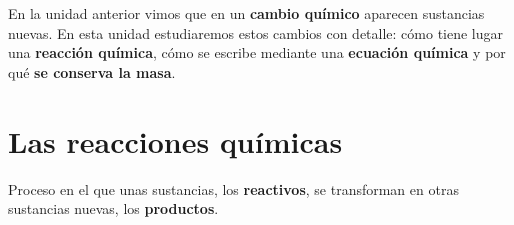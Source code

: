 %
%

\raggedbottom %

En la unidad anterior vimos que en un \textbf{cambio químico} aparecen sustancias nuevas. En esta unidad estudiaremos estos cambios con detalle: cómo tiene lugar una \textbf{reacción química}, cómo se escribe mediante una \textbf{ecuación química} y por qué \textbf{se conserva la masa}.

\section{Las reacciones químicas}

\begin{definition}
    Proceso en el que unas sustancias, los \textbf{reactivos}, se transforman en otras sustancias nuevas, los \textbf{productos}.
\end{definition}

